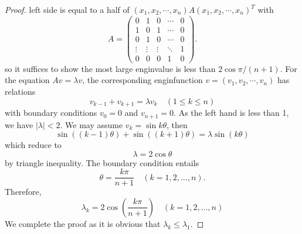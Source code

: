 \begin{proof}
    left side is equal to a half of $(x_1,x_2,\cdots, x_n)A(x_1,x_2,\cdots, x_n)^T$ with 
    \begin{equation*}
        A = \begin{pmatrix}
            0 & 1 & 0 & \cdots & 0 \\
            1 & 0 & 1 & \cdots & 0 \\
            0 & 1 & 0 & \cdots & 0 \\
            \vdots & \vdots & \vdots & \ddots & 1 \\
            0 & 0 & 0 & 1 & 0
            \end{pmatrix}.
    \end{equation*}
so it suffices to show the most large enginvalue is less than $2\cos\pi/(n+1)$. 
For the equation $Av = \lambda v$,
the corresponding enginfunction $v = (v_1,v_2,\cdots, v_n)$ has relations 
\[
v_{k-1} + v_{k+1} = \lambda v_k \quad (1 \leq k \leq n)
\]
with boundary conditions $v_0=0$ and $v_{n+1} = 0$. As the left hand is less than 1, we have $|\lambda| < 2$. We may assume $v_k = \sin k\theta$, then 
\[
\sin((k-1)\theta) + \sin((k+1)\theta) = \lambda \sin(k\theta)
\]
which reduce to 
\[
\lambda = 2\cos\theta
\]
by triangle inequality.
The boundary condition entails 
\[
\theta = \frac{k\pi}{n+1} \quad (k = 1, 2, \dots, n).
\]
Therefore,
\[
\boxed{\lambda_k = 2\cos\left(\frac{k\pi}{n+1}\right) \quad (k = 1, 2, \dots, n)}
\]
We complete the proof as it is obvious that $\lambda_k \leq \lambda_1$.
\end{proof}